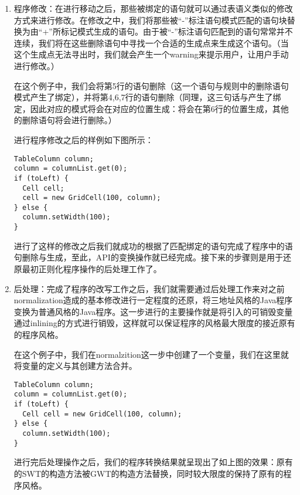 \begin{enumerate}
\item 程序修改：在进行移动之后，那些被绑定的语句就可以通过表语义类似的修改方式来进行修改。在修改之中，我们将那些被“-”标注语句模式匹配的语句块替换为由“+”所标记模式生成的语句。由于被“-”标注语句匹配到的语句常常并不连续，我们将在这些删除语句中寻找一个合适的生成点来生成这个语句。（当这个生成点无法寻出时，我们就会产生一个warning来提示用户，让用户手动进行修改。）

在这个例子中，我们会将第5行的语句删除（这一个语句与规则中的删除语句模式产生了绑定），并将第4,6,7行的语句删除（同理，这三句话与产生了绑定，因此对应的模式将会在对应的位置生成：将会在第6行的位置生成，其他的删除语句将会进行删除。）

进行程序修改之后的样例如下图所示：

\begin{center}
\begin{smpage}{0.5\columnwidth}
\begin{lstlisting}[style=java]
TableColumn column;
column = columnList.get(0);
if (toLeft) {
  Cell cell;
  cell = new GridCell(100, column);
} else {
  column.setWidth(100);
}
\end{lstlisting}
\end{smpage}
\end{center}

进行了这样的修改之后我们就成功的根据了匹配绑定的语句完成了程序中的语句删除与生成，至此，API的变换操作就已经完成。接下来的步骤则是用于还原最初正则化程序操作的后处理工作了。

\item 后处理：完成了程序的改写工作之后，我们就需要通过后处理工作来对之前normalization造成的基本修改进行一定程度的还原，将三地址风格的Java程序变换为普通风格的Java程序。这一步进行的主要操作就是将引入的可销毁变量通过inlining的方式进行销毁，这样就可以保证程序的风格最大限度的接近原有的程序风格。

在这个例子中，我们在normalzition这一步中创建了一个变量，我们在这里就将变量的定义与其创建方法合并。

\begin{center}
\begin{smpage}{0.6\columnwidth}
\begin{lstlisting}[style=java]
TableColumn column;
column = columnList.get(0);
if (toLeft) {
  Cell cell = new GridCell(100, column);
} else {
  column.setWidth(100);
}
\end{lstlisting}
\end{smpage}
\end{center}

进行完后处理操作之后，我们的程序转换结果就呈现出了如上图的效果：原有的SWT的构造方法被GWT的构造方法替换，同时较大限度的保持了原有的程序风格。
\end{enumerate}


